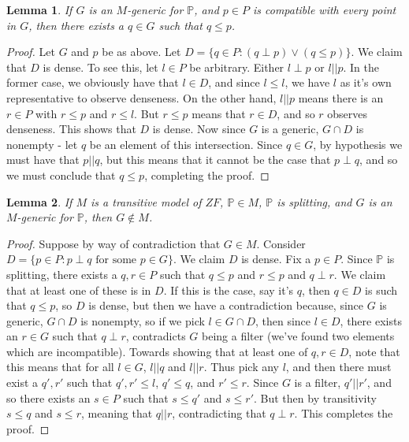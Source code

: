 \documentclass{article}
\theoremstyle{definition}
\theoremstyle{plain}
\theoremstyle{theorem}
\newtheorem{lemma}{Lemma}[section]
\begin{document}
\begin{lemma}
	If $G$ is an $M$-generic for $\mathbb{P}$, and $p \in P$ is compatible with every point in $G$, then there exists a $q \in G$ such that $q \leq p$. 
\end{lemma}
\begin{proof}
	Let $G$ and $p$ be as above. Let $D = \{q \in P: (q \perp p) \vee (q \leq p) \}$. We claim that $D$ is dense. To see this, let $l \in P$ be arbitrary. Either $l \perp p$ or $l || p$. In the former case, we obviously have that $l \in D$, and since $l \leq l$, we have $l$ as it's own representative to observe denseness. On the other hand, $l ||p$ means there is an $r \in P$ with $r \leq p$ and $r \leq l$. But $r \leq p$ means that $r \in D$, and so $r$ observes denseness. This shows that $D$ is dense. Now since $G$ is a generic, $G \cap D$ is nonempty - let $q$ be an element of this intersection. Since $q \in G$, by hypothesis we must have that $p ||q$, but this means that it cannot be the case that $p \perp q$, and so we must conclude that $q \leq p$, completing the proof. 
\end{proof}
\begin{lemma}
	If $M$ is a transitive model of $ZF$, $\mathbb{P} \in M$, $\mathbb{P}$ is splitting, and $G$ is an $M$-generic for $\mathbb{P}$, then $G \notin M$. 
\end{lemma}
\begin{proof}
	Suppose by way of contradiction that $G \in M$. Consider $D = \{p \in P: p \perp q \textrm{ for some }p \in G\}$. We claim $D$ is dense. Fix a $p \in P$. Since $\mathbb{P}$ is splitting, there exists a $q,r \in P$ such that $q \leq p$ and $r \leq p$ and $q \perp r$. We claim that at least one of these is in $D$. If this is the case, say it's $q$, then $q \in D$ is such that $q \leq p$, so $D$ is dense, but then we have a contradiction because, since $G$ is generic, $G \cap D$ is nonempty, so if we pick $l \in G \cap D$, then since $l \in D$, there exists an $r \in G$ such that $q \perp r$, contradicts $G$ being a filter (we've found two elements which are incompatible). Towards showing that at least one of $q,r \in D$, note that this means that for all $l \in G$, $ l||q$ and $l||r$. Thus pick any $l$, and then there must exist a $q',r'$ such that $q',r' \leq l$, $q' \leq q$, and $r' \leq r$. Since $G$ is a filter, $q'||r'$, and so there exists an $s \in P$ such that $s \leq q'$ and $s \leq r'$. But then by transitivity $s \leq q$ and $s \leq r$, meaning that $q ||r$, contradicting that $q \perp r$. This completes the proof. 
\end{proof}
\end{document}

